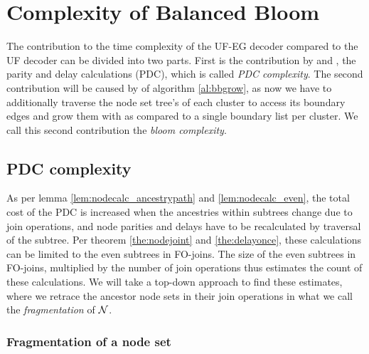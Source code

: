 \section{Complexity of Balanced Bloom}\label{sec:ufbbcomplexity}

The contribution to the time complexity of the UF-EG decoder compared to the UF decoder can be divided into two parts. First is the contribution by  and , the parity and delay calculations (PDC), which is called \emph{PDC complexity}. The second contribution will be caused by  of algorithm \ref{al:bbgrow}, as now we have to additionally traverse the node set tree's of each cluster to access its boundary edges and grow them with  as compared to a single boundary list per cluster. We call this second contribution the \emph{bloom complexity}.

\subsection{PDC complexity}
As per lemma \ref{lem:nodecalc_ancestrypath} and \ref{lem:nodecalc_even}, the total cost of the PDC is increased when the ancestries within subtrees change due to join operations, and node parities and delays have to be recalculated by traversal of the subtree. Per theorem \ref{the:nodejoint} and \ref{the:delayonce}, these calculations can be limited to the even subtrees in FO-joins. The size of the even subtrees in FO-joins, multiplied by the number of join operations thus estimates the count of these calculations. We will take a top-down approach to find these estimates, where we retrace the ancestor node sets in their join operations in what we call the \emph{fragmentation} of $\mathcal{N}$.

\subsubsection{Fragmentation of a node set}

